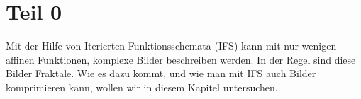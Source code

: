 %
%
%
\section{Teil 0\label{ifs:section:teil0}}
Mit der Hilfe von Iterierten Funktionsschemata (IFS) kann mit nur wenigen affinen Funktionen, komplexe Bilder beschreiben werden.
In der Regel sind diese Bilder Fraktale.
Wie es dazu kommt, und wie man mit IFS auch Bilder komprimieren kann, wollen wir in diesem Kapitel untersuchen.



